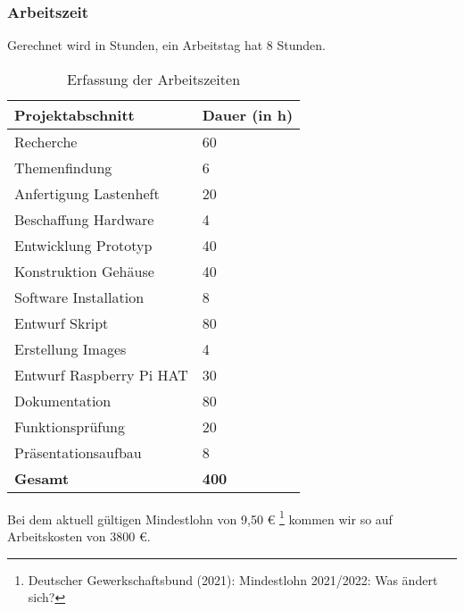 \subsubsection{Arbeitszeit}\label{ku_kosten_zeit}
Gerechnet wird in Stunden, ein Arbeitstag hat 8 Stunden.
\begin{center}
\begin{table}[H]
    \begin{tabularx}{\textwidth}{|p{11.8cm}|p{2.8cm}|}
        \hline
 	    \textbf{Projektabschnitt} & \textbf{Dauer (in h)} \\
	    \hline
	    \hline
	    Recherche & 60 \\
	    \hline
	    Themenfindung & 6 \\
	    \hline
	    Anfertigung Lastenheft & 20 \\
	    \hline
	    Beschaffung Hardware & 4 \\
	    \hline
	    Entwicklung Prototyp & 40 \\
	    \hline
	    Konstruktion Gehäuse & 40 \\
	    \hline
	    Software Installation & 8 \\
	    \hline
	    Entwurf Skript & 80 \\
	    \hline
	    Erstellung Images & 4 \\
	    \hline
	    Entwurf Raspberry Pi HAT & 30 \\
	    \hline
	    Dokumentation & 80 \\
	    \hline
	    Funktionsprüfung & 20 \\
	    \hline
	    Präsentationsaufbau & 8 \\
	    \hline
	    \hline
	    \textbf{Gesamt} & \textbf{400} \\
	    \hline
    \end{tabularx}
    \caption{Erfassung der Arbeitszeiten}
    \label{tab:ku_arbeitszeiten}
\end{table}
\end{center}
\noindent Bei dem aktuell gültigen Mindestlohn von 9,50 \euro{} \footnote{Deutscher Gewerkschaftsbund (2021): Mindestlohn 2021/2022: Was ändert sich?} kommen wir so auf Arbeitskosten von 3800 \euro{}.